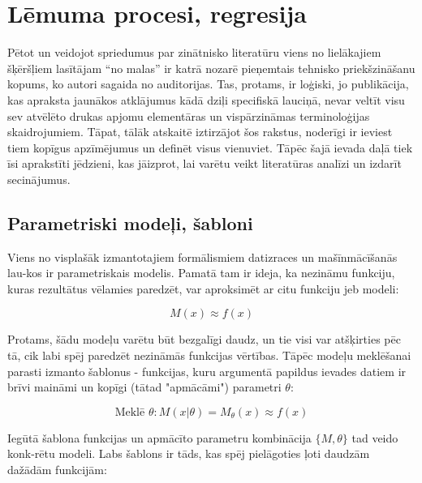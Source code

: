 \documentclass[12pt, a4paper]{article}
\numberwithin{equation}{section} %
\begin{document}
%
%
%
%
%
%
%
%
%
%
%
%
%
%
%
%
%
%
%

\newpage
\section{Lēmuma procesi, regresija}

Pētot un veidojot spriedumus par zinātnisko literatūru viens no lielākajiem šķēršļiem lasītājam ``no malas'' ir katrā nozarē pieņemtais tehnisko priekšzināšanu kopums, ko autori sagaida no auditorijas. Tas, protams, ir loģiski, jo publikācija, kas apraksta jaunākos atklājumus kādā dziļi specifiskā lauciņā, nevar veltīt visu sev atvēlēto drukas apjomu elementāras un vispārzināmas terminoloģijas skaidrojumiem. Tāpat, tālāk atskaitē iztirzājot šos rakstus, noderīgi ir ieviest tiem kopīgus apzīmējumus un definēt visus vienuviet. Tāpēc šajā ievada daļā tiek īsi aprakstīti jēdzieni, kas jāizprot, lai varētu veikt literatūras analīzi un izdarīt secinājumus.

\subsection{Parametriski modeļi, šabloni}

Viens no visplašāk izmantotajiem formālismiem datizraces un mašīnmācīšanās lau-kos ir parametriskais modelis. Pamatā tam ir ideja, ka nezināmu funkciju, kuras rezultātus vēlamies paredzēt, var aproksimēt ar citu funkciju jeb modeli:

\begin{equation} 
    M(x) \approx f(x)
\end{equation}

Protams, šādu modeļu varētu būt bezgalīgi daudz, un tie visi var atšķirties pēc tā, cik labi spēj paredzēt nezināmās funkcijas vērtības. Tāpēc modeļu meklēšanai parasti izmanto šablonus - funkcijas, kuru argumentā papildus ievades datiem ir brīvi maināmi un kopīgi (tātad "apmācāmi") parametri $\theta$:

\begin{equation} 
    \text{Meklē } \theta:M(x \vert \theta) = M_{\theta}(x)  \approx f(x)
\end{equation}

Iegūtā šablona funkcijas un apmācīto parametru kombinācija $\lbrace M, \theta \rbrace$ tad veido konk-rētu modeli. Labs šablons ir tāds, kas spēj pielāgoties ļoti daudzām dažādām funkcijām:
\end{document}
